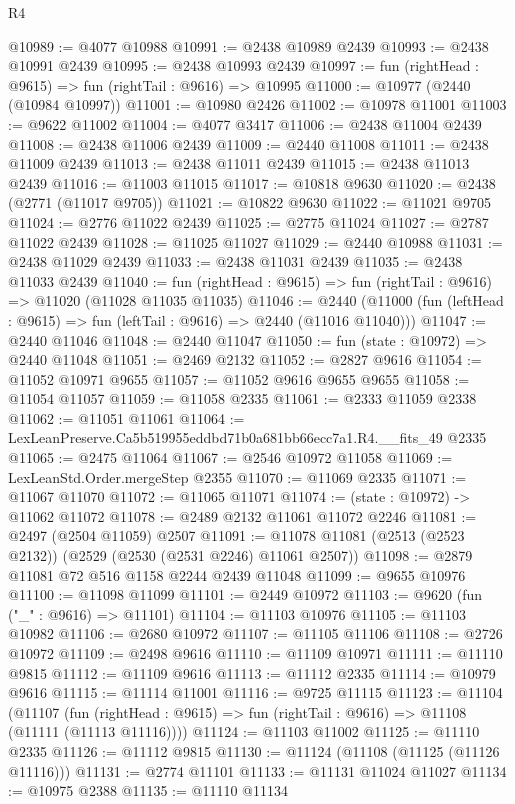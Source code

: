\begin{lexlean}{R4}
\begin{coremodule}
@10989 := @4077 @10988
@10991 := @2438 @10989 @2439
@10993 := @2438 @10991 @2439
@10995 := @2438 @10993 @2439
@10997 := fun (rightHead : @9615) => fun (rightTail : @9616) => @10995
@11000 := @10977 (@2440 (@10984 @10997))
@11001 := @10980 @2426
@11002 := @10978 @11001
@11003 := @9622 @11002
@11004 := @4077 @3417
@11006 := @2438 @11004 @2439
@11008 := @2438 @11006 @2439
@11009 := @2440 @11008
@11011 := @2438 @11009 @2439
@11013 := @2438 @11011 @2439
@11015 := @2438 @11013 @2439
@11016 := @11003 @11015
@11017 := @10818 @9630
@11020 := @2438 (@2771 (@11017 @9705))
@11021 := @10822 @9630
@11022 := @11021 @9705
@11024 := @2776 @11022 @2439
@11025 := @2775 @11024
@11027 := @2787 @11022 @2439
@11028 := @11025 @11027
@11029 := @2440 @10988
@11031 := @2438 @11029 @2439
@11033 := @2438 @11031 @2439
@11035 := @2438 @11033 @2439
@11040 := fun (rightHead : @9615) => fun (rightTail : @9616) => @11020 (@11028 @11035 @11035)
@11046 := @2440 (@11000 (fun (leftHead : @9615) => fun (leftTail : @9616) => @2440 (@11016 @11040)))
@11047 := @2440 @11046
@11048 := @2440 @11047
@11050 := fun (state : @10972) => @2440 @11048
@11051 := @2469 @2132
@11052 := @2827 @9616
@11054 := @11052 @10971 @9655
@11057 := @11052 @9616 @9655 @9655
@11058 := @11054 @11057
@11059 := @11058 @2335
@11061 := @2333 @11059 @2338
@11062 := @11051 @11061
@11064 := LexLeanPreserve.Ca5b519955eddbd71b0a681bb66ecc7a1.R4.__fits_49 @2335
@11065 := @2475 @11064
@11067 := @2546 @10972 @11058
@11069 := LexLeanStd.Order.mergeStep @2355
@11070 := @11069 @2335
@11071 := @11067 @11070
@11072 := @11065 @11071
@11074 := (state : @10972) -> @11062 @11072
@11078 := @2489 @2132 @11061 @11072 @2246
@11081 := @2497 (@2504 @11059) @2507
@11091 := @11078 @11081 (@2513 (@2523 @2132)) (@2529 (@2530 (@2531 @2246) @11061 @2507))
@11098 := @2879 @11081 @72 @516 @1158 @2244 @2439 @11048
@11099 := @9655 @10976
@11100 := @11098 @11099
@11101 := @2449 @10972
@11103 := @9620 (fun ("_" : @9616) => @11101)
@11104 := @11103 @10976
@11105 := @11103 @10982
@11106 := @2680 @10972
@11107 := @11105 @11106
@11108 := @2726 @10972
@11109 := @2498 @9616
@11110 := @11109 @10971
@11111 := @11110 @9815
@11112 := @11109 @9616
@11113 := @11112 @2335
@11114 := @10979 @9616
@11115 := @11114 @11001
@11116 := @9725 @11115
@11123 := @11104
    (@11107 (fun (rightHead : @9615) => fun (rightTail : @9616) => @11108 (@11111 (@11113 @11116))))
@11124 := @11103 @11002
@11125 := @11110 @2335
@11126 := @11112 @9815
@11130 := @11124 (@11108 (@11125 (@11126 @11116)))
@11131 := @2774 @11101
@11133 := @11131 @11024 @11027
@11134 := @10975 @2388
@11135 := @11110 @11134

\end{coremodule}
\end{lexlean}
